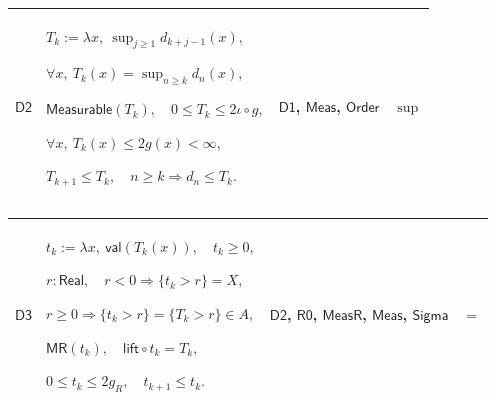 \documentclass[11pt]{amsart}
\newlength{\FTCFourColumnBody}
\begin{document}
{\begin{tabular}
\end{tabular}%
\par\setlength{\parskip}{0pt}\nointerlineskip
\noindent
\begin{tabular}{|@{}>{\centering\arraybackslash}m{0.078431\FTCFourColumnBody}|>{\centering\arraybackslash}m{0.535947\FTCFourColumnBody}|>{\centering\arraybackslash}m{0.281045\FTCFourColumnBody}|>{\centering\arraybackslash}m{0.104575\FTCFourColumnBody}|}\hline
\hypertarget{dct:D2}{$\displaystyle \textsf{D2}$} & $\displaystyle T_k:=\lambda x,\ \sup_{j\ge1}d_{k+j-1}(x),$\par
$\displaystyle \forall x,\ T_k(x)=\sup_{n\ge k}d_n(x),$\par
$\displaystyle \textsf{Measurable}(T_k),\quad0\le T_k\le2\iota\circ g,$\par
$\displaystyle \forall x,\ T_k(x)\le2g(x)<\infty,$\par
$\displaystyle T_{k+1}\le T_k,\quad n\ge k\Rightarrow d_n\le T_k.$ & \hyperlink{dct:D1}{$\displaystyle \textsf{D1}$}, \hyperlink{lem:Meas}{$\displaystyle \textsf{Meas}$}, \hyperlink{ax:Order}{$\displaystyle \textsf{Order}$} & $\displaystyle \sup$\\ \hline
\end{tabular}%
\par\setlength{\parskip}{0pt}\nointerlineskip
\noindent
\begin{tabular}{|@{}>{\centering\arraybackslash}m{0.078431\FTCFourColumnBody}|>{\centering\arraybackslash}m{0.535947\FTCFourColumnBody}|>{\centering\arraybackslash}m{0.281045\FTCFourColumnBody}|>{\centering\arraybackslash}m{0.104575\FTCFourColumnBody}|}\hline
\hypertarget{dct:D3}{$\displaystyle \textsf{D3}$} & $\displaystyle t_k:=\lambda x,\ \textsf{val}(T_k(x)),\quad t_k\ge0,$\par
$\displaystyle r:\textsf{Real},\quad r<0\Rightarrow\{t_k>r\}=X,$\par
$\displaystyle r\ge0\Rightarrow\{t_k>r\}=\{T_k>r\}\in A,$\par
$\displaystyle \textsf{MR}(t_k),\quad\textsf{lift}\circ t_k=T_k,$\par
$\displaystyle 0\le t_k\le2g_R,\quad t_{k+1}\le t_k.$ & \hyperlink{dct:D2}{$\displaystyle \textsf{D2}$}, \hyperlink{dct:R0}{$\displaystyle \textsf{R0}$}, \hyperlink{dctdef:MeasR}{$\displaystyle \textsf{MeasR}$}, \hyperlink{def:Meas}{$\displaystyle \textsf{Meas}$}, \hyperlink{ax:Sigma}{$\displaystyle \textsf{Sigma}$} & $\displaystyle =$\\ \hline
\end{tabular}%
\par\setlength{\parskip}{0pt}\nointerlineskip
}
\end{document}
